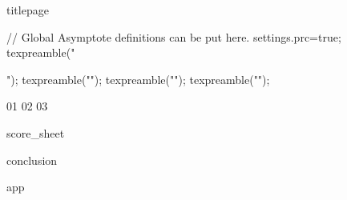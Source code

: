 \documentclass[a4paper,12pt]{article}
\begin{document}
{titlepage}
\clearpage
  \setcounter{page}{2}
  \tableofcontents
\clearpage


\begin{asydef}
// Global Asymptote definitions can be put here.
settings.prc=true;
texpreamble("\usepackage{xltxtra,unicode-math}");
texpreamble("\setmainfont{Times New Roman}");
texpreamble("\setsansfont{Arial}\setmonofont{Courier New}");
texpreamble("");
\end{asydef}

{01}
{02}
{03}

\clearpage
  {score_sheet}
\clearpage

\clearpage
  {conclusion}
\clearpage

\clearpage
  {app}
\clearpage
\end{document}
